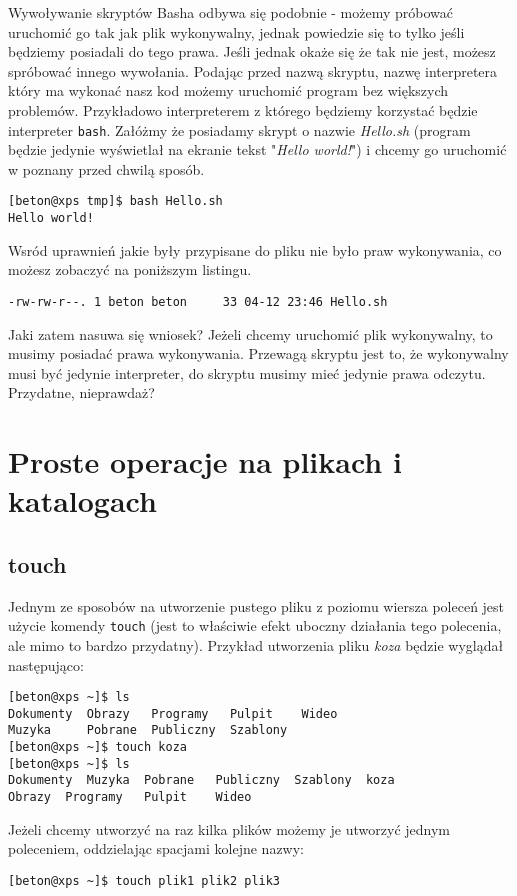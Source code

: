 \newline
\newline
Wywoływanie skryptów Basha odbywa się podobnie - możemy próbować uruchomić go tak jak plik wykonywalny, jednak powiedzie się to tylko jeśli będziemy posiadali do tego prawa. Jeśli jednak okaże się że tak nie jest, możesz spróbować innego wywołania. Podając przed nazwą skryptu, nazwę interpretera który ma wykonać nasz kod możemy uruchomić program bez większych problemów. Przykładowo interpreterem z którego będziemy korzystać będzie interpreter \texttt{bash}. Załóżmy że posiadamy skrypt o nazwie \textit{Hello.sh} (program będzie jedynie wyświetlał na ekranie tekst 
"\textit{Hello world!}") i chcemy go uruchomić w poznany przed chwilą sposób.
\begin{verbatim}
[beton@xps tmp]$ bash Hello.sh 
Hello world!
\end{verbatim} 
Wsród uprawnień jakie były przypisane do pliku nie było praw wykonywania, co możesz zobaczyć na poniższym listingu.
\begin{verbatim}
-rw-rw-r--. 1 beton beton     33 04-12 23:46 Hello.sh
\end{verbatim}
Jaki zatem nasuwa się wniosek? Jeżeli chcemy uruchomić plik wykonywalny, to musimy posiadać prawa wykonywania. Przewagą skryptu jest to, że wykonywalny musi być jedynie interpreter, do skryptu musimy mieć jedynie prawa odczytu. Przydatne, nieprawdaż?

\section{Proste operacje na plikach i katalogach}
\subsection{touch}
Jednym ze sposobów na utworzenie pustego pliku z poziomu wiersza poleceń jest użycie komendy \texttt{touch} (jest to właściwie efekt uboczny działania tego polecenia, ale mimo to bardzo przydatny). Przykład utworzenia pliku \textit{koza} będzie wyglądał następująco:
\begin{verbatim}
[beton@xps ~]$ ls
Dokumenty  Obrazy   Programy   Pulpit    Wideo
Muzyka     Pobrane  Publiczny  Szablony
[beton@xps ~]$ touch koza
[beton@xps ~]$ ls
Dokumenty  Muzyka  Pobrane   Publiczny  Szablony  koza
Obrazy  Programy   Pulpit    Wideo
\end{verbatim}
Jeżeli chcemy utworzyć na raz kilka plików możemy je utworzyć jednym poleceniem, oddzielając spacjami kolejne nazwy:
\begin{verbatim}
[beton@xps ~]$ touch plik1 plik2 plik3
\end{verbatim}
